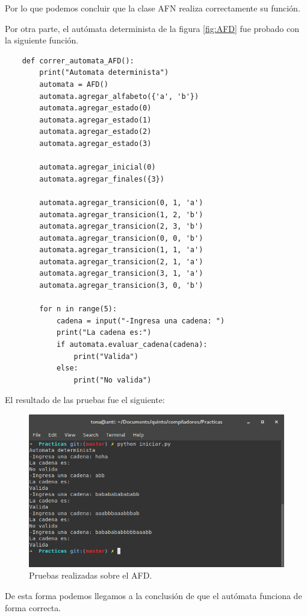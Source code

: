 \documentclass[titlepage]{article}
\begin{document}
	Por lo que podemos concluir que la clase AFN realiza correctamente su función.
	
	Por otra parte, el autómata determinista de la figura \ref{fig:AFD} fue probado con la siguiente función.
	
	\begin{lstlisting}
	def correr_automata_AFD():
		print("Automata determinista")
		automata = AFD()
		automata.agregar_alfabeto({'a', 'b'})
		automata.agregar_estado(0)
		automata.agregar_estado(1)
		automata.agregar_estado(2)
		automata.agregar_estado(3)
		
		automata.agregar_inicial(0)
		automata.agregar_finales({3})
		
		automata.agregar_transicion(0, 1, 'a')
		automata.agregar_transicion(1, 2, 'b')
		automata.agregar_transicion(2, 3, 'b')
		automata.agregar_transicion(0, 0, 'b')
		automata.agregar_transicion(1, 1, 'a')
		automata.agregar_transicion(2, 1, 'a')
		automata.agregar_transicion(3, 1, 'a')
		automata.agregar_transicion(3, 0, 'b')
		
		for n in range(5):
			cadena = input("-Ingresa una cadena: ")
			print("La cadena es:")
			if automata.evaluar_cadena(cadena):
				print("Valida")
			else:
				print("No valida")
	\end{lstlisting}
	
	El resultado de las pruebas fue el siguiente:
	
	\begin{figure}[H]
		\begin{center}
			\includegraphics[width=12cm]{AFDprueba.png}
			\caption{Pruebas realizadas sobre el AFD.}
			\label{fig:AFD2}
		\end{center}
	\end{figure}

	De esta forma podemos llegamos a la conclusión de que el autómata funciona de forma correcta.
	
\end{document}
